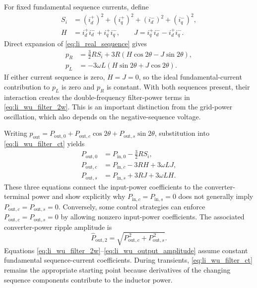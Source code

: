 For fixed fundamental sequence currents, define
\begin{equation}\label{eq:li_wu_hj}
\begin{aligned}
S_i&=(i_d^+)^2+(i_q^+)^2+(i_d^-)^2+(i_q^-)^2,\\
H&=i_d^+i_d^-+i_q^+i_q^-,\qquad
J=i_q^+i_d^--i_d^+i_q^- .
\end{aligned}
\end{equation}
Direct expansion of \eqref{eq:li_real_sequence} gives
\begin{equation}\label{eq:li_wu_filter_2w}
\begin{aligned}
p_R&=\frac32RS_i+3R(H\cos2\theta-J\sin2\theta),\\
p_L&=-3\omega L(H\sin2\theta+J\cos2\theta).
\end{aligned}
\end{equation}
If either current sequence is zero, \(H=J=0\), so the ideal fundamental-current contribution to \(p_L\) is zero and \(p_R\) is constant. With both sequences present, their interaction creates the double-frequency filter-power terms in \eqref{eq:li_wu_filter_2w}. This is an important distinction from the grid-power oscillation, which also depends on the negative-sequence voltage.

Writing \(p_{\mathrm{out}}=P_{\mathrm{out},0}+P_{\mathrm{out},c}\cos2\theta+P_{\mathrm{out},s}\sin2\theta\), substitution into \eqref{eq:li_wu_filter_ct} yields
\begin{equation}\label{eq:li_wu_output_coeff}
\begin{aligned}
P_{\mathrm{out},0}&=P_{\mathrm{in},0}-\frac32RS_i,\\
P_{\mathrm{out},c}&=P_{\mathrm{in},c}-3RH+3\omega LJ,\\
P_{\mathrm{out},s}&=P_{\mathrm{in},s}+3RJ+3\omega LH .
\end{aligned}
\end{equation}
These three equations connect the input-power coefficients to the converter-terminal power and show explicitly why \(P_{\mathrm{in},c}=P_{\mathrm{in},s}=0\) does not generally imply \(P_{\mathrm{out},c}=P_{\mathrm{out},s}=0\). Conversely, some control strategies can enforce \(P_{\mathrm{out},c}=P_{\mathrm{out},s}=0\) by allowing nonzero input-power coefficients. The associated converter-power ripple amplitude is
\begin{equation}\label{eq:li_wu_output_amplitude}
\widehat P_{\mathrm{out},2}=\sqrt{P_{\mathrm{out},c}^{\,2}+P_{\mathrm{out},s}^{\,2}}.
\end{equation}
Equations \eqref{eq:li_wu_filter_2w}--\eqref{eq:li_wu_output_amplitude} assume constant fundamental sequence-current coefficients. During transients, \eqref{eq:li_wu_filter_ct} remains the appropriate starting point because derivatives of the changing sequence components contribute to the inductor power.

